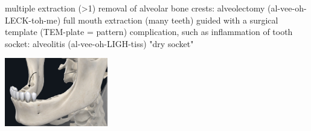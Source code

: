 \documentclass[
paper=landscape,
paper=160mm:90mm, %
fontsize=11pt, %
pagesize, %
parskip=half-, %
]{scrartcl} %
\theoremstyle{mythmstyle} %
\begin{document}
\begin{minipage}[c]{0.45\linewidth}
\begin{outline}
\1 multiple extraction (>1)
\2 removal of alveolar bone crests: alveolectomy (al-vee-oh-LECK-toh-me)
\1 full mouth extraction (many teeth)
\2 guided with a surgical template  (TEM-plate = pattern)
\0 complication, such as
\1 inflammation of tooth socket: alveolitis (al-vee-oh-LIGH-tiss)
\1 "dry socket"

\end{outline}
\end{minipage}
\begin{minipage}[c]{0.5\linewidth}

\includegraphics[width=4.5cm]{8272E96F-2F4C-4CA3-819B-C93D7E515B20.jpeg}

\end{minipage}
\end{document}
